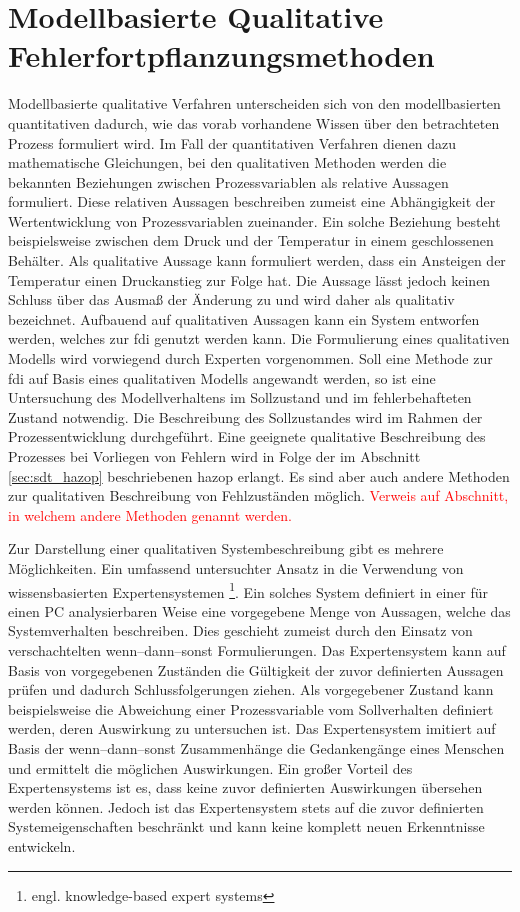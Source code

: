 \section{Modellbasierte Qualitative  Fehlerfortpflanzungsmethoden}\label{sec:fAna_modQual}
Modellbasierte qualitative Verfahren unterscheiden sich von den modellbasierten quantitativen dadurch, wie das vorab vorhandene Wissen \"uber den betrachteten Prozess formuliert wird. Im Fall der quantitativen Verfahren dienen dazu mathematische Gleichungen, bei den qualitativen Methoden werden die bekannten Beziehungen zwischen Prozessvariablen als relative Aussagen formuliert. Diese relativen Aussagen beschreiben zumeist eine Abh\"angigkeit der Wertentwicklung von Prozessvariablen zueinander. Ein solche Beziehung besteht beispielsweise zwischen dem Druck und der Temperatur in einem geschlossenen Beh\"alter. Als qualitative Aussage kann formuliert werden, dass ein Ansteigen der Temperatur einen Druckanstieg zur Folge hat. Die Aussage l\"asst jedoch keinen Schluss \"uber das Ausma\ss{} der \"Anderung zu und wird daher als qualitativ bezeichnet. \newline
Aufbauend auf qualitativen Aussagen kann ein System entworfen werden, welches zur \ac{fdi} genutzt werden kann. \newline
Die Formulierung eines qualitativen Modells wird vorwiegend durch Experten vorgenommen. Soll eine Methode zur \ac{fdi} auf Basis eines qualitativen Modells angewandt werden, so ist eine Untersuchung des Modellverhaltens im Sollzustand und im fehlerbehafteten Zustand notwendig. Die Beschreibung des Sollzustandes wird im Rahmen der Prozessentwicklung durchgef\"uhrt. Eine geeignete qualitative Beschreibung des Prozesses bei Vorliegen von Fehlern wird in Folge der im Abschnitt \ref{sec:sdt_hazop} beschriebenen \ac{hazop} erlangt. Es sind aber auch andere Methoden zur qualitativen Beschreibung von Fehlzust\"anden m\"oglich. \textcolor{red}{Verweis auf Abschnitt, in welchem andere Methoden genannt werden.}

Zur Darstellung einer qualitativen Systembeschreibung gibt es mehrere M\"oglichkeiten. Ein umfassend untersuchter Ansatz in die Verwendung von wissensbasierten Expertensystemen \footnote{engl. knowledge-based expert systems}. Ein solches System definiert in einer f\"ur einen PC analysierbaren Weise eine vorgegebene Menge von Aussagen, welche das Systemverhalten beschreiben. Dies geschieht zumeist durch den Einsatz von verschachtelten wenn--dann--sonst Formulierungen. Das Expertensystem kann auf Basis von vorgegebenen Zust\"anden die G\"ultigkeit der zuvor definierten Aussagen pr\"ufen und dadurch Schlussfolgerungen ziehen. Als vorgegebener Zustand kann beispielsweise die Abweichung einer Prozessvariable vom Sollverhalten definiert werden, deren Auswirkung zu untersuchen ist. Das Expertensystem imitiert auf Basis der wenn--dann--sonst Zusammenh\"ange die Gedankeng\"ange eines Menschen und ermittelt die m\"oglichen Auswirkungen. Ein gro\ss{}er Vorteil des Expertensystems ist es, dass keine zuvor definierten Auswirkungen \"ubersehen werden k\"onnen. Jedoch ist das Expertensystem stets auf die zuvor definierten Systemeigenschaften beschr\"ankt und kann keine komplett neuen Erkenntnisse entwickeln.  

